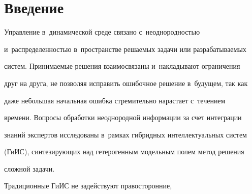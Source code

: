   























      \thispagestyle{headings}


      


      \vspace*{-18pt} 





  \section{Введение}


  


  Управление в~динамической среде связано с~неоднородностью 


и~распределенностью в~пространстве решаемых задачи или разрабатываемых 


систем. Принимаемые решения взаимосвязаны и~накладывают ограничения 


друг на друга, не позволяя исправить ошибочное решение в~будущем, так как 


даже небольшая начальная ошибка стремительно нарастает с~течением 


времени. Вопросы обработки неоднородной информации за счет интеграции 


знаний экспертов исследованы в~рамках гибридных интеллектуальных систем 


(ГиИС), синтезирующих над гетерогенным модельным полем метод решения 


сложной задачи. 


  


  Традиционные ГиИС не задействуют правосторонние,  


